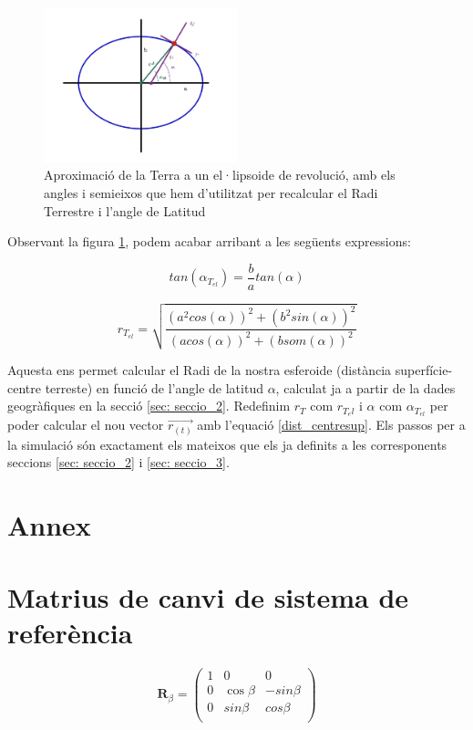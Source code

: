 \documentclass[11pt]{article}
\begin{document}
\begin{figure}[hbt]
    \centering
    \includegraphics[width=0.5\textwidth]{Terraelipsoide.jpg}
    \caption{Aproximació de la Terra a un el·lipsoide de revolució, amb els angles i semieixos que hem d'utilitzat per recalcular el Radi Terrestre i l'angle de Latitud}
    \label{fig:terraelipsoide}
\end{figure}

Observant la figura \ref{fig:terraelipsoide}, podem acabar arribant a les següents expressions:

\begin{equation}
    tan(\alpha_{T_{el}}) = \frac{b}{a}tan(\alpha) 
\end{equation}

\begin{equation}
    r_{T_{el}} = \sqrt{\frac{(a^2cos(\alpha))^2+(b^2sin(\alpha))^2}{(acos(\alpha))^2+(bsom(\alpha))^2}}
\end{equation}

Aquesta ens permet calcular el Radi de la nostra esferoide (distància superfície-centre terreste) en funció de l'angle de latitud $\alpha$, calculat ja a partir de la dades geogràfiques en la secció \ref{sec: seccio_2}. Redefinim $r_T$ com $r_{T_el}$ i $\alpha$ com $\alpha_{T_{el}}$ per poder calcular el nou vector $\vec{r_{(t)}}$ amb l'equació \eqref{dist_centresup}. Els passos per a la simulació són exactament els mateixos que els ja definits a les corresponents seccions \ref{sec: seccio_2} i \ref{sec: seccio_3}.

\section*{Annex}
\appendix

\section{Matrius de canvi de sistema de referència}\label{annex: matr_rot}
\begin{equation}
    \mathbf{R}_{\beta}=
    \begin{pmatrix}
      1 & 0 & 0   \\
      0 & \cos\beta& -sin\beta \\
      0 & sin\beta & cos\beta \\
    \end{pmatrix}
\end{equation}  
\end{document}
